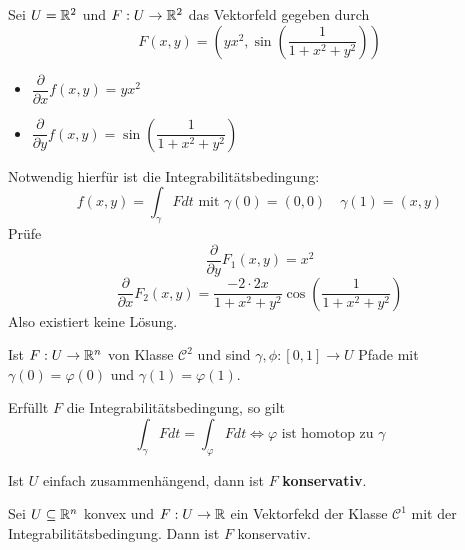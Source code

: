 \documentclass[main.tex]{subfiles}
\begin{document}
\begin{Beispiel}
  Sei $U = \mathbb{R}^2$ und $F : U \to \mathbb{R}^2$ das Vektorfeld gegeben durch
  $$F(x,y) = \left(yx^2, \sin\left(\dfrac{1}{1 + x^2 + y^2}\right)\right)$$
  \begin{itemize}
    \item $\dfrac{\partial }{\partial x} f(x,y) = yx^2$
    \item $\dfrac{\partial }{\partial y} f(x,y) = \sin\left(\dfrac{1}{1 + x^2 + y^2}\right)$
  \end{itemize}
  Notwendig hierfür ist die Integrabilitätsbedingung:
  $$f(x,y) = \int_\gamma F dt \text{ mit } \gamma(0)=(0,0) \quad \gamma(1)=(x,y)$$
  Prüfe
  $$\dfrac{\partial}{\partial y} F_1(x,y) = x^2$$
  $$\dfrac{\partial}{\partial x} F_2(x,y) = \dfrac{-2 \cdot 2x}{1 + x^2 + y^2}\cos\left(\dfrac{1}{1 + x^2 + y^2}\right)$$
  Also existiert keine Lösung.
\end{Beispiel}

\begin{Theorem}
  Ist $F: U \to \mathbb{R}^n$ von Klasse $\mathcal{C}^2$ und sind $\gamma, \phi : [0,1] \to U$ Pfade mit $\gamma(0) = \varphi(0)$ und $\gamma(1) = \varphi(1)$.

  Erfüllt $F$ die Integrabilitätsbedingung, so gilt
  $$\int_\gamma F dt = \int_\varphi F dt \Leftrightarrow \varphi \text{ ist homotop zu } \gamma$$
\end{Theorem}

\begin{Korollar}
  Ist $U$ einfach zusammenhängend, dann ist $F$ \textbf{konservativ}.
\end{Korollar}

\begin{Lemma}
  Sei $U \subseteq \mathbb{R}^n$ konvex und $F:U \to \mathbb{R}$ ein Vektorfekd der Klasse $\mathcal{C}^1$ mit der Integrabilitätsbedingung. Dann ist $F$ konservativ.
\end{Lemma}
\end{document}
